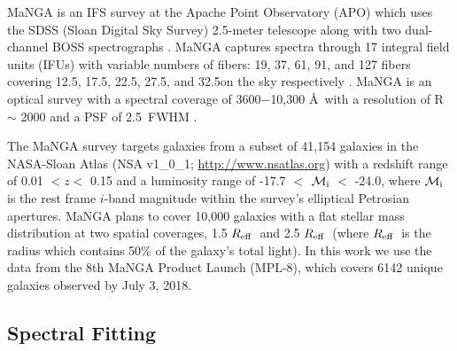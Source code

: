 \documentclass[iop,revtex4,twocolumn,apj,numberedappendix,appendixfloats]{emulateapj}
\newcommand{\reff}{$R_{\rm eff}$}
\begin{document}
MaNGA is an IFS survey at the Apache Point Observatory (APO) which uses the SDSS (Sloan Digital Sky Survey) 2.5-meter telescope along with two dual-channel BOSS spectrographs \citep{Drory:2015}. MaNGA captures spectra through 17 integral field units (IFUs) with variable numbers of fibers: 19, 37, 61, 91, and 127 fibers covering 12.5\arcsec, 17.5\arcsec, 22.5\arcsec, 27.5\arcsec, and 32.5\arcsec on the sky respectively \citep{Law:2015}. MaNGA is an optical survey with a spectral coverage of 3600$-$10,300 \AA\ with a resolution of R $\sim$ 2000 and a PSF of 2.5\arcsec\ FWHM \citep{Bundy:2015}. 

The MaNGA survey targets galaxies from a subset of 41,154 galaxies in the NASA-Sloan Atlas (NSA v1\_0\_1; \url{http://www.nsatlas.org}) with a redshift range of 0.01 $< z <$ 0.15 and a luminosity range of -17.7 $<$ $\mathcal{M}_{\rm i}$ $<$ -24.0, where $\mathcal{M}_{\rm i}$ is the rest frame $i$-band magnitude within the survey's elliptical Petrosian apertures. MaNGA plans to cover 10,000 galaxies with a flat stellar mass distribution at two spatial coverages, 1.5 \reff\ and 2.5 \reff\ (where \reff\ is the radius which contains 50\% of the galaxy's total light). In this work we use the data from the 8th MaNGA Product Launch (MPL-8), which covers 6142 unique galaxies observed by July 3, 2018. 

\subsection{Spectral Fitting}\label{sec:spfit}
\end{document}
